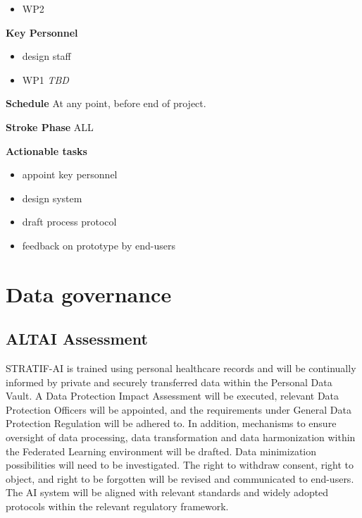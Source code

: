 \documentclass[
  letterpaper,
  DIV=11,
  numbers=noendperiod]{scrreport}
\providecommand{\tightlist}{%
  \setlength{\itemsep}{0pt}\setlength{\parskip}{0pt}}\usepackage{longtable,booktabs,array}
\begin{document}
\begin{itemize}
\tightlist
\item
  WP2
\end{itemize}

\textbf{Key Personnel}

\begin{itemize}
\tightlist
\item
  design staff
\item
  WP1 \emph{TBD}
\end{itemize}

\textbf{Schedule} At any point, before end of project.

\textbf{Stroke Phase} ALL

\textbf{Actionable tasks}

\begin{itemize}
\tightlist
\item
  appoint key personnel
\item
  design system
\item
  draft process protocol
\item
  feedback on prototype by end-users
\end{itemize}

\hypertarget{data-governance}{%
\section{Data governance}\label{data-governance}}

\hypertarget{altai-assessment-7}{%
\subsection*{ALTAI Assessment}\label{altai-assessment-7}}

STRATIF-AI is trained using personal healthcare records and will be
continually informed by private and securely transferred data within the
Personal Data Vault. A Data Protection Impact Assessment will be
executed, relevant Data Protection Officers will be appointed, and the
requirements under General Data Protection Regulation will be adhered
to. In addition, mechanisms to ensure oversight of data processing, data
transformation and data harmonization within the Federated Learning
environment will be drafted. Data minimization possibilities will need
to be investigated. The right to withdraw consent, right to object, and
right to be forgotten will be revised and communicated to end-users. The
AI system will be aligned with relevant standards and widely adopted
protocols within the relevant regulatory framework.
\end{document}
